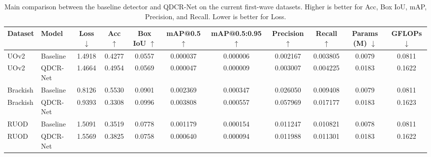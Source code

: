 \begin{table}[t]
\centering
\caption{Main comparison between the baseline detector and QDCR-Net on the current first-wave datasets. Higher is better for Acc, Box IoU, mAP, Precision, and Recall. Lower is better for Loss.}
\label{tab:main_comparison}
\setlength{\tabcolsep}{5pt}
\begin{tabular}{llccccccccc}
\toprule
Dataset & Model & Loss $\downarrow$ & Acc $\uparrow$ & Box IoU $\uparrow$ & mAP@0.5 $\uparrow$ & mAP@0.5:0.95 $\uparrow$ & Precision $\uparrow$ & Recall $\uparrow$ & Params (M) $\downarrow$ & GFLOPs $\downarrow$ \\
\midrule
UOv2 & Baseline & 1.4918 & 0.4277 & 0.0557 & 0.000037 & 0.000006 & 0.002167 & 0.003805 & 0.0079 & 0.0811 \\
UOv2 & QDCR-Net & 1.4664 & 0.4954 & 0.0569 & 0.000047 & 0.000009 & 0.003007 & 0.004225 & 0.0183 & 0.1622 \\
\midrule
Brackish & Baseline & 0.8126 & 0.5530 & 0.0901 & 0.002369 & 0.000347 & 0.026050 & 0.009408 & 0.0079 & 0.0811 \\
Brackish & QDCR-Net & 0.9393 & 0.3308 & 0.0996 & 0.003808 & 0.000557 & 0.057969 & 0.017177 & 0.0183 & 0.1623 \\
\midrule
RUOD & Baseline & 1.5091 & 0.3519 & 0.0778 & 0.001179 & 0.000154 & 0.011247 & 0.010821 & 0.0078 & 0.0811 \\
RUOD & QDCR-Net & 1.5569 & 0.3825 & 0.0758 & 0.000640 & 0.000094 & 0.011988 & 0.011301 & 0.0183 & 0.1622 \\
\bottomrule
\end{tabular}
\end{table}
